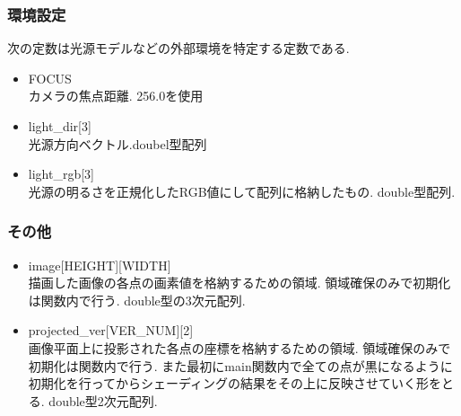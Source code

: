 \documentclass[a4j,dvipdfmx]{jsarticle}
\begin{document}
\subsubsection{環境設定}
次の定数は光源モデルなどの外部環境を特定する定数である.
\begin{itemize}
\item FOCUS\\
  カメラの焦点距離. 256.0を使用
  
\item light\_dir[3]\\
  光源方向ベクトル.doubel型配列
  
\item light\_rgb[3]\\
  光源の明るさを正規化したRGB値にして配列に格納したもの.
  double型配列.
  
\end{itemize}

\subsubsection{その他}
\begin{itemize}
\item image[HEIGHT][WIDTH]\\
  描画した画像の各点の画素値を格納するための領域.
  領域確保のみで初期化は関数内で行う.
  double型の3次元配列.
  
\item projected\_ver[VER\_NUM][2]\\
  画像平面上に投影された各点の座標を格納するための領域.
  領域確保のみで初期化は関数内で行う.
  また最初にmain関数内で全ての点が黒になるように
  初期化を行ってからシェーディングの結果をその上に反映させていく形をとる.
  double型2次元配列.
\end{itemize}

\end{document}
